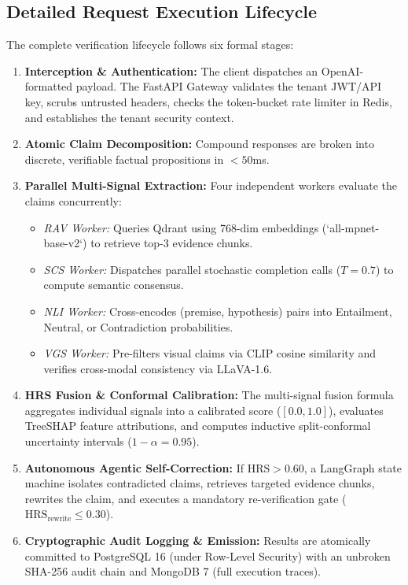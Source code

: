 \documentclass[11pt,a4paper]{article}
\begin{document}
\subsection{Detailed Request Execution Lifecycle}
The complete verification lifecycle follows six formal stages:
\begin{enumerate}[leftmargin=*]
    \item \textbf{Interception \& Authentication:} The client dispatches an OpenAI-formatted payload. The FastAPI Gateway validates the tenant JWT/API key, scrubs untrusted headers, checks the token-bucket rate limiter in Redis, and establishes the tenant security context.
    \item \textbf{Atomic Claim Decomposition:} Compound responses are broken into discrete, verifiable factual propositions in $<50$ms.
    \item \textbf{Parallel Multi-Signal Extraction:} Four independent workers evaluate the claims concurrently:
    \begin{itemize}[leftmargin=*]
        \item \textit{RAV Worker:} Queries Qdrant using 768-dim embeddings (`all-mpnet-base-v2`) to retrieve top-3 evidence chunks.
        \item \textit{SCS Worker:} Dispatches parallel stochastic completion calls ($T=0.7$) to compute semantic consensus.
        \item \textit{NLI Worker:} Cross-encodes (premise, hypothesis) pairs into Entailment, Neutral, or Contradiction probabilities.
        \item \textit{VGS Worker:} Pre-filters visual claims via CLIP cosine similarity and verifies cross-modal consistency via LLaVA-1.6.
    \end{itemize}
    \item \textbf{HRS Fusion \& Conformal Calibration:} The multi-signal fusion formula aggregates individual signals into a calibrated score ($[0.0, 1.0]$), evaluates TreeSHAP feature attributions, and computes inductive split-conformal uncertainty intervals ($1-\alpha=0.95$).
    \item \textbf{Autonomous Agentic Self-Correction:} If $\text{HRS} > 0.60$, a LangGraph state machine isolates contradicted claims, retrieves targeted evidence chunks, rewrites the claim, and executes a mandatory re-verification gate ($\text{HRS}_{\text{rewrite}} \le 0.30$).
    \item \textbf{Cryptographic Audit Logging \& Emission:} Results are atomically committed to PostgreSQL 16 (under Row-Level Security) with an unbroken SHA-256 audit chain and MongoDB 7 (full execution traces).
\end{enumerate}
\end{document}
